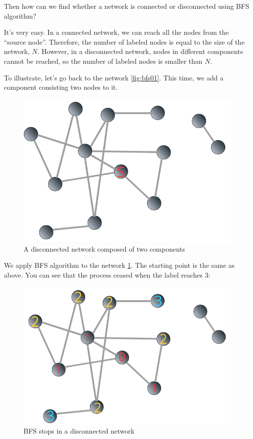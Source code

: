 \documentclass[
]{krantz}
\begin{document}
Then how can we find whether a network is connected or disconnected using BFS algorithm?

It's very easy. In a connected network, we can reach all the nodes from the ``source node''. Therefore, the number of labeled nodes is equal to the size of the network, \(N\). However, in a disconnected network, nodes in different components cannot be reached, so the number of labeled nodes is smaller than \(N\).

To illustrate, let's go back to the network \ref{fig:bfs01}. This time, we add a component consisting two nodes to it.

\begin{figure}

{\centering \includegraphics[width=0.65\linewidth]{images/bfsD1} 

}

\caption{A disconnected network composed of two components}\label{fig:bfsD1}
\end{figure}

We apply BFS algorithm to the network \ref{fig:bfsD1}. The starting point is the same as above. You can see that the process ceased when the label reaches \(3\):

\begin{figure}

{\centering \includegraphics[width=0.65\linewidth]{images/bfsD2} 

}

\caption{BFS stops in a disconnected network}\label{fig:bfsD2}
\end{figure}
\end{document}
